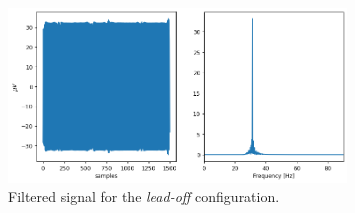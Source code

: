 \begin{figure}
\begin{centering}
\includegraphics[width=0.8\textwidth]{Cap2/Figures/imedances_signal_filtered.png}
\par\end{centering}
\caption{Filtered signal for the \textit{lead-off} configuration.}
\label{fig:bci_drivers}
\end{figure}